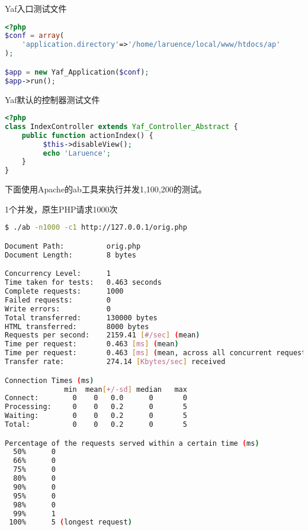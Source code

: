 \begin{example}
Yaf入口测试文件
\begin{lstlisting}[language=PHP]
<?php
$conf = array(
    'application.directory'=>'/home/laruence/local/www/htdocs/ap'
);

$app = new Yaf_Application($conf);
$app->run();
\end{lstlisting}
\end{example}

\begin{example}
Yaf默认的控制器测试文件
\begin{lstlisting}[language=PHP]
<?php
class IndexController extends Yaf_Controller_Abstract {
    public function actionIndex() {
         $this->disableView();
         echo 'Laruence';
    }
}
\end{lstlisting}
\end{example}

下面使用Apache的ab工具来执行并发1,100,200的测试。

\begin{example}
1个并发，原生PHP请求1000次
\begin{lstlisting}[language=bash]
$ ./ab -n1000 -c1 http://127.0.0.1/orig.php

Document Path:          orig.php
Document Length:        8 bytes

Concurrency Level:      1
Time taken for tests:   0.463 seconds
Complete requests:      1000
Failed requests:        0
Write errors:           0
Total transferred:      130000 bytes
HTML transferred:       8000 bytes
Requests per second:    2159.41 [#/sec] (mean)
Time per request:       0.463 [ms] (mean)
Time per request:       0.463 [ms] (mean, across all concurrent requests)
Transfer rate:          274.14 [Kbytes/sec] received

Connection Times (ms)
              min  mean[+/-sd] median   max
Connect:        0    0   0.0      0       0
Processing:     0    0   0.2      0       5
Waiting:        0    0   0.2      0       5
Total:          0    0   0.2      0       5

Percentage of the requests served within a certain time (ms)
  50%      0
  66%      0
  75%      0
  80%      0
  90%      0
  95%      0
  98%      0
  99%      1
 100%      5 (longest request)
\end{lstlisting}
\end{example}


